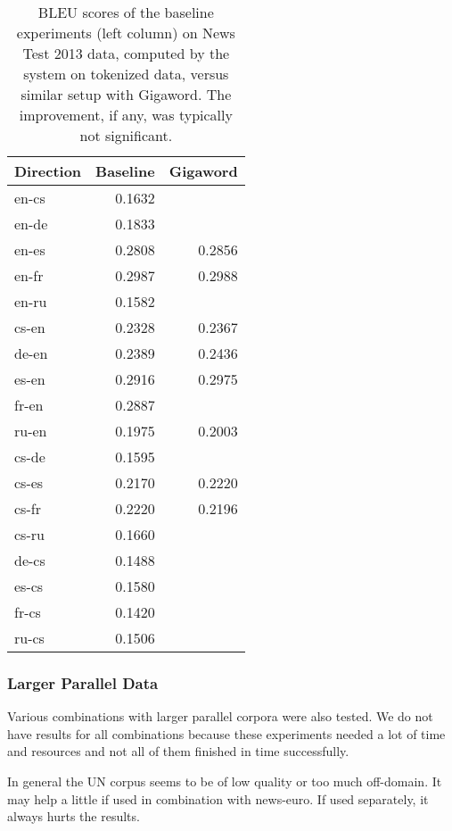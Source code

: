 \documentclass[11pt,letterpaper]{article}
\begin{document}
\begin{table}[htbl]
\begin{center}
\begin{tabular}{l | r r}
Direction & Baseline & Gigaword\\
\hline
en-cs & 0.1632 & \\
en-de & 0.1833 & \\
en-es & 0.2808 & 0.2856\\
en-fr & 0.2987 & 0.2988\\
en-ru & 0.1582 & \\
cs-en & 0.2328 & 0.2367\\
de-en & 0.2389 & 0.2436\\
es-en & 0.2916 & 0.2975\\
fr-en & 0.2887 & \\
ru-en & 0.1975 & 0.2003\\
\hline
cs-de & 0.1595 & \\
cs-es & 0.2170 & 0.2220\\
cs-fr & 0.2220 & 0.2196\\
cs-ru & 0.1660 & \\
de-cs & 0.1488 & \\
es-cs & 0.1580 & \\
fr-cs & 0.1420 & \\
ru-cs & 0.1506 & \\
\end{tabular}
\end{center}
\caption{BLEU scores of the baseline experiments (left column) on News Test 2013 data, computed by the system on tokenized data, versus similar setup with Gigaword.
The improvement, if any, was typically not significant.}
\label{tab:largelmbleu}
\end{table}




\subsubsection{Larger Parallel Data}
\label{sec:un}

Various combinations with larger parallel corpora were also tested.
We do not have results for all combinations because these experiments needed
a lot of time and resources and not all of them finished in time successfully.

In general the UN corpus seems to be of low quality or too much off-domain.
It may help a little if used in combination with news-euro.
If used separately, it always hurts the results.
\end{document}
